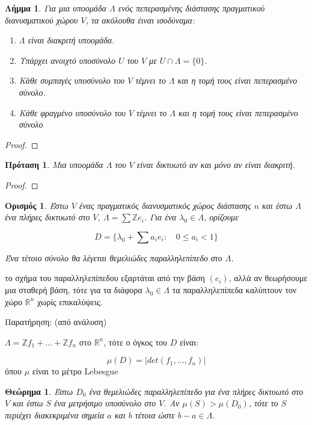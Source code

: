 \documentclass[oneside,a4paper]{article}
\newtheorem{theorem}{Θεώρημα}
\newtheorem{lemma}{Λήμμα}
\newtheorem*{defn}{Ορισμός}
\newtheorem{prop}{Πρόταση}
\newcommand {\tl}{\textlatin}
\newcommand{\Z}{\mathbb{Z}}
\begin{document}
\begin{lemma}
	Για μια υποομάδα $\Lambda$ ενός πεπερασμένης διάστασης πραγματικού διανυσματικού χώρου $V$, τα ακόλουθα έιναι ισοδύναμα:
	\begin{enumerate}
		\item $\Lambda$ είναι διακριτή υποομάδα.
		\item Υπάρχει ανοιχτό υποσύνολο $U$ του $V$ με $U\cap \Lambda = \{0\}$.
		\item Κάθε συμπαγές υποσύνολο του $V$ τέμνει το $\Lambda$ και η τομή τους είναι πεπερασμένο σύνολο.
		\item Κάθε φραγμένο υποσύνολο του $V$ τέμνει το $\Lambda$ και η τομή τους είναι πεπερασμένο σύνολο
	\end{enumerate}
\end{lemma}

\begin{proof}
\end{proof}

\begin{prop}
	Μια υποομάδα $\Lambda$ του $V$ είναι δικτυωτό αν και μόνο αν είναι διακριτή.
\end{prop}

\begin{proof}
\end{proof}


\begin{defn}
	Έστω $V$ ένας πραγματικός διανυσματικός χώρος διάστασης $n$ και έστω $\Lambda$ ένα πλήρες δικτυωτό στο $V$, $\Lambda = \sum \Z e_i$. Για ένα $\lambda_0 \in \Lambda$, ορίζουμε
	
	$$D = \{\lambda_0 + \sum a_i e_i: \quad 0\leq a_i < 1\}$$

	Ένα τέτοιο σύνολο θα λέγεται θεμελιώδες παραλληλεπίπεδο στο $\Lambda$.
\end{defn}

το σχήμα του παραλληλεπίπεδου εξαρτάται από την βάση $(e_i)$, αλλά αν θεωρήσουμε μια σταθερή βάση, τότε για τα διάφορα $\lambda_0 \in \Lambda$ τα παραλληλεπίπεδα καλύπτουν τον χώρο $\mathbb{R}^n$ χωρίς επικαλύψεις.


Παρατήρηση: (από ανάλυση)

$\Lambda = \Z f_1 + \ldots + \Z f_n$ στο $\mathbb{R}^n$, τότε ο όγκος του $D$ είναι:

$$\mu (D) = |det(f_1,\ldots,f_n)|$$ όπου $\mu$ είναι το μέτρο \tl{Lebesgue}


\begin{theorem}
	Έστω $D_0$ ένα θεμελιώδες παραλληλεπίπεδο για ένα πλήρες δικτυωτό στο $V$ και έστω $S$ ένα μετρήσιμο υποσύνολο στο $V$. Αν $\mu(S) > \mu (D_0)$, τότε το $S$ περιέχει διακεκριμένα σημεία $a$ και $b$ τέτοια ώστε $b-a \in \Lambda$.

\end{theorem}
\end{document}
